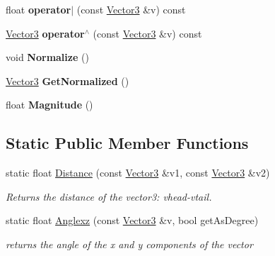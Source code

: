 \begin{DoxyCompactItemize}
\item 
\hypertarget{classrcz_engine_1_1_vector3_a23cfff68d2f54f05768f98f0da486083}{}float {\bfseries operator$\vert$} (const \hyperlink{classrcz_engine_1_1_vector3}{Vector3} \&v) const \label{classrcz_engine_1_1_vector3_a23cfff68d2f54f05768f98f0da486083}

\item 
\hypertarget{classrcz_engine_1_1_vector3_adc8f0321c33fea1aa7603e5a0ff74ff5}{}\hyperlink{classrcz_engine_1_1_vector3}{Vector3} {\bfseries operator$^\wedge$} (const \hyperlink{classrcz_engine_1_1_vector3}{Vector3} \&v) const \label{classrcz_engine_1_1_vector3_adc8f0321c33fea1aa7603e5a0ff74ff5}

\item 
\hypertarget{classrcz_engine_1_1_vector3_a7ce4fb53a8dcda79ae23c9980759d853}{}void {\bfseries Normalize} ()\label{classrcz_engine_1_1_vector3_a7ce4fb53a8dcda79ae23c9980759d853}

\item 
\hypertarget{classrcz_engine_1_1_vector3_a862d7b31f8fd57bcaa8d2914ce498df4}{}\hyperlink{classrcz_engine_1_1_vector3}{Vector3} {\bfseries Get\+Normalized} ()\label{classrcz_engine_1_1_vector3_a862d7b31f8fd57bcaa8d2914ce498df4}

\item 
\hypertarget{classrcz_engine_1_1_vector3_ab14d13e613cf2633b92d4c4e00c4e1f0}{}float {\bfseries Magnitude} ()\label{classrcz_engine_1_1_vector3_ab14d13e613cf2633b92d4c4e00c4e1f0}

\end{DoxyCompactItemize}
\subsection*{Static Public Member Functions}
\begin{DoxyCompactItemize}
\item 
\hypertarget{classrcz_engine_1_1_vector3_a89ab598b4bf094b8bfb4db6e88de2d57}{}static float \hyperlink{classrcz_engine_1_1_vector3_a89ab598b4bf094b8bfb4db6e88de2d57}{Distance} (const \hyperlink{classrcz_engine_1_1_vector3}{Vector3} \&v1, const \hyperlink{classrcz_engine_1_1_vector3}{Vector3} \&v2)\label{classrcz_engine_1_1_vector3_a89ab598b4bf094b8bfb4db6e88de2d57}

\begin{DoxyCompactList}\small\item\em Returns the distance of the vector3\+: vhead-\/vtail. \end{DoxyCompactList}\item 
\hypertarget{classrcz_engine_1_1_vector3_a20053259db3588c2b9ac45fddd184e9d}{}static float \hyperlink{classrcz_engine_1_1_vector3_a20053259db3588c2b9ac45fddd184e9d}{Anglexz} (const \hyperlink{classrcz_engine_1_1_vector3}{Vector3} \&v, bool get\+As\+Degree)\label{classrcz_engine_1_1_vector3_a20053259db3588c2b9ac45fddd184e9d}

\begin{DoxyCompactList}\small\item\em returns the angle of the x and y components of the vector \end{DoxyCompactList}\end{DoxyCompactItemize}
